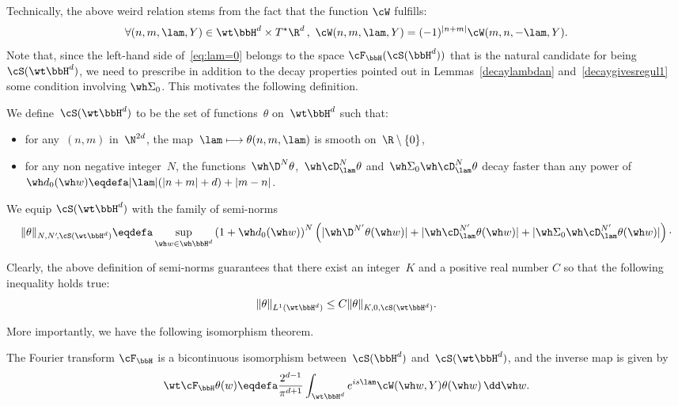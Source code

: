 Technically, the above weird relation stems from the fact that the function $\cW$ fulfills:
\begin{equation}\label{eq:symW}
\forall (n,m,\lam,Y) \in \wt \bbH^d\times T^\star \R^d\,,\ \cW(n,m,\lam,Y)=(-1)^{|n+m|}\cW(m,n,-\lam,Y).
\end{equation}
Note that, since the left-hand side of~\eqref{eq:lam=0} belongs to the space $\cF_\bbH(\cS(\bbH^d))$ that is the natural candidate for being $\cS(\wt\bbH^d)$, we need to prescribe in addition to the decay properties pointed out in Lemmas~\ref{decaylambdan} and~\ref{decaygivesregul1} some condition involving $\wh\Sigma_0$. This motivates the following definition.

\begin{defi}\label{definrangeS}
We define~$\cS(\wt \bbH ^{d})$ to be the set of functions~$\theta$ on~$\wt \bbH^d$ such that:
\begin{itemize}
\item for any~$(n,m)$ in~$\N^{2d}$, the map~$\lam\longmapsto \theta(n,m,\lam)$ is smooth on~$\R\setminus\{0\}$,
\item for any non negative integer~$N$, the functions~$\wh \D^N\theta$,~$\wh\cD_\lam^N\theta$ and~$\wh \Sigma_0\wh\cD_\lam^N\theta$ decay faster than any power of~$\wh d_0(\wh w)\eqdefa |\lam| (|n+m| +d) +|m-n|$.
\end{itemize}
We equip $\cS(\wt\bbH^d)$ with the family of semi-norms
\[
\|\theta \|_{N,N'\!,\cS(\wt \bbH^d)} \eqdefa \sup_{\wh w\in \wh\bbH^d} \left(1+\wh d_0(\wh w)\right) ^N
\left(|\wh \D^{N'} \theta (\wh w)|+ |\wh \cD_\lam^{N'} \theta (\wh w)| + |\wh \Sigma_0\wh \cD_\lam^{N'}\theta (\wh w)|\right)\cdotp
\]
\end{defi}

Clearly, the above definition of semi-norms guarantees that there exist an integer~$K$ and a positive real number $C$ so that the following inequality holds true:
\begin{equation}\label{control}
\|\theta\|_{L^1(\wt\bbH^d)}\leq C\|\theta\|_{K,0,\cS(\wt\bbH^d)}.
\end{equation}

More importantly, we have the following isomorphism theorem.

\begin{theo}\label{MappingofPH}
The Fourier transform $\cF_\bbH$ is a bicontinuous isomorphism between~$\cS(\bbH^{d})$ and~$\cS(\wt \bbH^d)$, and the inverse map is given by
\begin{equation}\label{MappingofPHdemoeq1b}
\wt\cF_\bbH \theta(w)\eqdefa \frac {2^{d-1}} {\pi^{d+1} } \int_{\wt \bbH^d} e^{is\lam} \cW(\wh w, Y)\theta (\wh w) \, \dd\wh w.
\end{equation}
\end{theo}

